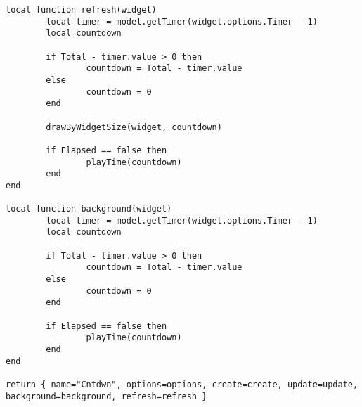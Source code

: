 \begin{lstlisting}
local function refresh(widget)
        local timer = model.getTimer(widget.options.Timer - 1)
        local countdown

        if Total - timer.value > 0 then
                countdown = Total - timer.value
        else
                countdown = 0
        end

        drawByWidgetSize(widget, countdown)

        if Elapsed == false then
                playTime(countdown)
        end
end

local function background(widget)
        local timer = model.getTimer(widget.options.Timer - 1)
        local countdown

        if Total - timer.value > 0 then
                countdown = Total - timer.value
        else
                countdown = 0
        end

        if Elapsed == false then
                playTime(countdown)
        end
end

return { name="Cntdwn", options=options, create=create, update=update, background=background, refresh=refresh }
\end{lstlisting}

\clearpage
{}
